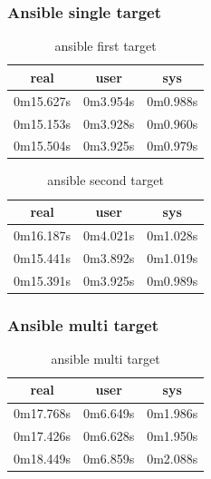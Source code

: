 \documentclass[10pt,]{report}
\begin{document}
\begin{adjustwidth}{20pt}{}
	\subsubsection{Ansible single target}
	\begin{table}[H]
		\caption{ansible first target}
		\begin{center}
			\begin{tabular}[c]{|c|c|c|}
				\hline
				\multicolumn{1}{|c|}{\textbf{real}} &
				\multicolumn{1}{c|}{\textbf{user}}  &
				\multicolumn{1}{c|}{\textbf{sys}}                         \\
				\hline
				0m15.627s                           & 0m3.954s & 0m0.988s \\
				\hline
				0m15.153s                           & 0m3.928s & 0m0.960s \\
				\hline
				0m15.504s                           & 0m3.925s & 0m0.979s \\
				\hline
			\end{tabular}
		\end{center}
	\end{table}
	\begin{table}[H]
		\caption{ansible second target}
		\begin{center}
			\begin{tabular}[c]{|c|c|c|}
				\hline
				\multicolumn{1}{|c|}{\textbf{real}} &
				\multicolumn{1}{c|}{\textbf{user}}  &
				\multicolumn{1}{c|}{\textbf{sys}}                         \\
				\hline
				0m16.187s                           & 0m4.021s & 0m1.028s \\
				\hline
				0m15.441s                           & 0m3.892s & 0m1.019s \\
				\hline
				0m15.391s                           & 0m3.925s & 0m0.989s \\
				\hline
			\end{tabular}
		\end{center}
	\end{table}
	\subsubsection{Ansible multi target}
	\begin{table}[H]
		\caption{ansible multi target}
		\begin{center}
			\begin{tabular}[c]{|c|c|c|}
				\hline
				\multicolumn{1}{|c|}{\textbf{real}} &
				\multicolumn{1}{c|}{\textbf{user}}  &
				\multicolumn{1}{c|}{\textbf{sys}}                         \\
				\hline
				0m17.768s                           & 0m6.649s & 0m1.986s \\
				\hline
				0m17.426s                           & 0m6.628s & 0m1.950s \\
				\hline
				0m18.449s                           & 0m6.859s & 0m2.088s \\
				\hline
			\end{tabular}
		\end{center}
	\end{table}

\end{adjustwidth}
\end{document}
